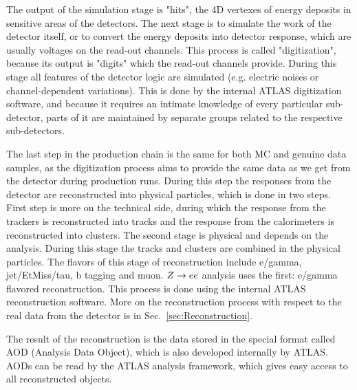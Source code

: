 The output of the simulation stage is "hits", the 4D vertexes of energy deposits in sensitive areas of the detectors. The next stage is to simulate the work of the detector itself, or to convert the energy deposits into detector response, which are usually voltages on the read-out channels. This process is called "digitization", because its output is "digits" which the read-out channels provide. During this stage all features of the detector logic are simulated (e.g. electric noises or channel-dependent variations). This is done by the internal ATLAS digitization software, and because it requires an intimate knowledge of every particular sub-detector, parts of it are maintained by separate groups related to the respective sub-detectors.

The last step in the production chain is the same for both MC and genuine data samples, as the digitization process aims to provide the same data as we get from the detector during production runs. During this step the responses from the detector are reconstructed into physical particles, which is done in two steps. First step is more on the technical side, during which the response from the trackers is reconstructed into tracks and the response from the calorimeters is reconstructed into clusters. The second stage is physical and depends on the analysis. During this stage the tracks and clusters are combined in the physical particles. The flavors of this stage of reconstruction include e/gamma, jet/EtMiss/tau, b tagging and muon. $Z \rightarrow ee$ analysis uses the first: e/gamma flavored reconstruction. This process is done using the internal ATLAS reconstruction software. More on the reconstruction process with respect to the real data from the detector is in Sec.~\ref{sec:Reconstruction}.

The result of the reconstruction is the data stored in the special format called AOD (Analysis Data Object), which is also developed internally by ATLAS. AODs can be read by the ATLAS analysis framework, which gives easy access to all reconstructed objects.

\begin{figure}
\end{figure}

